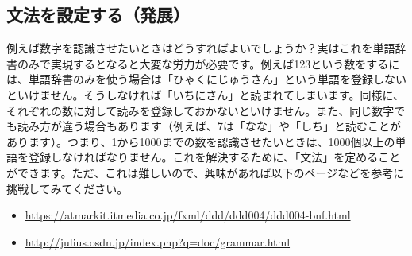 \subsection{文法を設定する（発展）}
例えば数字を認識させたいときはどうすればよいでしょうか？実はこれを単語辞書のみで実現するとなると大変な労力が必要です。例えば123という数をするには、単語辞書のみを使う場合は「ひゃくにじゅうさん」という単語を登録しないといけません。そうしなければ「いちにさん」と読まれてしまいます。同様に、それぞれの数に対して読みを登録しておかないといけません。また、同じ数字でも読み方が違う場合もあります（例えば、7は「なな」や「しち」と読むことがあります）。つまり、1から1000までの数を認識させたいときは、1000個以上の単語を登録しなければなりません。これを解決するために、「文法」を定めることができます。ただ、これは難しいので、興味があれば以下のページなどを参考に挑戦してみてください。
\begin{itemize}
\item \url{https://atmarkit.itmedia.co.jp/fxml/ddd/ddd004/ddd004-bnf.html}
\item \url{http://julius.osdn.jp/index.php?q=doc/grammar.html}
\end{itemize}
